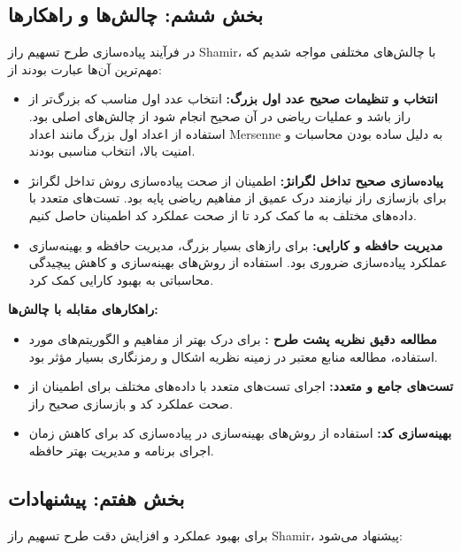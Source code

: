 \documentclass{report}
\begin{document}
 \subsection*{بخش ششم: چالش‌ها و راهکارها}
 در فرآیند پیاده‌سازی طرح تسهیم راز Shamir، با چالش‌های مختلفی مواجه شدیم که مهم‌ترین آن‌ها عبارت بودند از:

 \begin{itemize}
	     \item \textbf{انتخاب و تنظیمات صحیح عدد اول بزرگ:} انتخاب عدد اول مناسب که بزرگ‌تر از راز باشد و عملیات ریاضی در آن صحیح انجام شود از چالش‌های اصلی بود. استفاده از اعداد اول بزرگ مانند اعداد Mersenne به دلیل ساده بودن محاسبات و امنیت بالا، انتخاب مناسبی بودند.
	
	     \item \textbf{پیاده‌سازی صحیح تداخل لگرانژ:} اطمینان از صحت پیاده‌سازی روش تداخل لگرانژ برای بازسازی راز نیازمند درک عمیق از مفاهیم ریاضی پایه بود. تست‌های متعدد با داده‌های مختلف به ما کمک کرد تا از صحت عملکرد کد اطمینان حاصل کنیم.
	
	     \item \textbf{مدیریت حافظه و کارایی:} برای رازهای بسیار بزرگ، مدیریت حافظه و بهینه‌سازی عملکرد پیاده‌سازی ضروری بود. استفاده از روش‌های بهینه‌سازی و کاهش پیچیدگی محاسباتی به بهبود کارایی کمک کرد.
	 \end{itemize}

 \textbf{راهکارهای مقابله با چالش‌ها:}
 \begin{itemize}
	     \item \textbf{مطالعه دقیق نظریه پشت طرح :} برای درک بهتر از مفاهیم و الگوریتم‌های مورد استفاده، مطالعه منابع معتبر در زمینه نظریه اشکال و رمزنگاری بسیار مؤثر بود.
	
	     \item \textbf{تست‌های جامع و متعدد:} اجرای تست‌های متعدد با داده‌های مختلف برای اطمینان از صحت عملکرد کد و بازسازی صحیح راز.
	
	     \item \textbf{بهینه‌سازی کد:} استفاده از روش‌های بهینه‌سازی در پیاده‌سازی کد برای کاهش زمان اجرای برنامه و مدیریت بهتر حافظه.
	 \end{itemize}

 \subsection*{بخش هفتم: پیشنهادات}

 برای بهبود عملکرد و افزایش دقت طرح تسهیم راز Shamir، پیشنهاد می‌شود:
\end{document}
